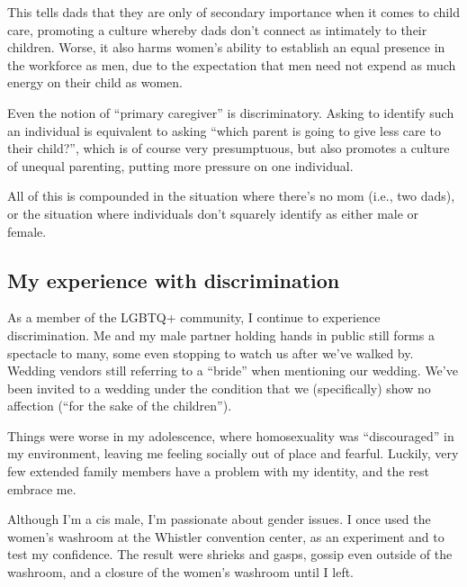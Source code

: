\documentclass[]{article}
\begin{document}
This tells dads that they are only of secondary importance when it comes to child care, promoting a culture whereby dads don't connect as intimately to their children. Worse, it also harms women's ability to establish an equal presence in the workforce as men, due to the expectation that men need not expend as much energy on their child as women.

Even the notion of ``primary caregiver'' is discriminatory. Asking to identify such an individual is equivalent to asking ``which parent is going to give less care to their child?'', which is of course very presumptuous, but also promotes a culture of unequal parenting, putting more pressure on one individual.

All of this is compounded in the situation where there's no mom (i.e., two dads), or the situation where individuals don't squarely identify as either male or female.

\hypertarget{my-experience-with-discrimination}{%
\subsection{My experience with discrimination}\label{my-experience-with-discrimination}}

As a member of the LGBTQ+ community, I continue to experience discrimination. Me and my male partner holding hands in public still forms a spectacle to many, some even stopping to watch us after we've walked by. Wedding vendors still referring to a ``bride'' when mentioning our wedding. We've been invited to a wedding under the condition that we (specifically) show no affection (``for the sake of the children'').

Things were worse in my adolescence, where homosexuality was ``discouraged'' in my environment, leaving me feeling socially out of place and fearful. Luckily, very few extended family members have a problem with my identity, and the rest embrace me.

Although I'm a cis male, I'm passionate about gender issues. I once used the women's washroom at the Whistler convention center, as an experiment and to test my confidence. The result were shrieks and gasps, gossip even outside of the washroom, and a closure of the women's washroom until I left.
\end{document}
